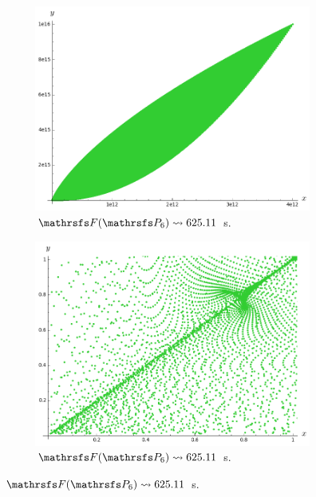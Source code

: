 \documentclass{beamer}
\begin{document}
\begin{frame}
\begin{figure}
\begin{subfigure}{.38\linewidth}\centering
\includegraphics[width=1\textwidth]{plots/ch5_21_P6.png}
\vspace{-0.1cm}\caption{$\FFF(\PP_6)\leadsto 625.11$ s.}
\end{subfigure}
\hspace{0.8cm}
\begin{subfigure}{.38\linewidth}\centering
\includegraphics[width=1\textwidth]{plots/ch5_22_P6prime.png}
\vspace{-0.1cm}\caption{$\FFF(\PP_6)\leadsto 625.11$ s.}
\end{subfigure}
\end{figure}
\end{frame}
\end{document}
